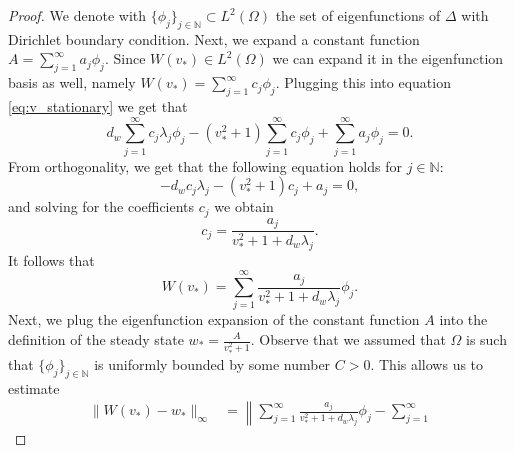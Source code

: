 \documentclass[review,onefignum,onetabnum]{SIAM-styles/siamart171218}
\begin{document}

\begin{proof}
    We denote with $\{\phi_j\}_{j \in \mathbb{N}} \subset L^2(\Omega)$ the set of eigenfunctions of $\Delta$ with Dirichlet boundary condition. Next, 
    we expand a constant function $A = \sum_{j=1}^\infty a_j \phi_j$. Since $W(v_*) \in L^2(\Omega)$ we can expand it in the eigenfunction basis as well, namely $W(v_*) = \sum_{j=1}^\infty c_j \phi_j$. Plugging this into equation \eqref{eq:v_stationary} we get that
    \begin{equation*}
        d_w\sum_{j=1}^\infty c_j \lambda_j \phi_j - (v_*^2 + 1) \sum_{j=1}^\infty c_j \phi_j + \sum_{j=1}^\infty a_j \phi_j = 0.
    \end{equation*}
    From orthogonality, we get that the following equation holds for $j \in \mathbb{N}$:
    \begin{equation*}
        -d_w c_j\lambda_j - (v_*^2+1) c_j + a_j = 0,
    \end{equation*}
    and solving for the coefficients $c_j$ we obtain
    \begin{equation*}
        c_j = \frac{a_j}{v_*^2 + 1 + d_w\lambda_j}.
    \end{equation*}
    It follows that
    \begin{equation*}
        W(v_*) = \sum_{j=1}^\infty \frac{a_j}{v_*^2 + 1 + d_w\lambda_j} \phi_j.
    \end{equation*}
    Next, we plug the eigenfunction expansion of the constant function $A$ into the definition of the steady state $w_* = \frac{A}{v_*^2 + 1}$. Observe that we assumed that $\Omega$ is such that $\{\phi_j\}_{j \in \mathbb{N}}$ is uniformly bounded by some number $C > 0$. This allows us to estimate
\begin{align*}
    \|W(v_*) - w_*\|_\infty 
    &= 
    \left\|
        \sum_{j=1}^\infty 
        \frac{a_j}{v_*^2 + 1 + d_w \lambda_j} \phi_j 
        - 
        \sum_{j=1}^\infty 

\end{align*}
\end{proof}
\end{document}
